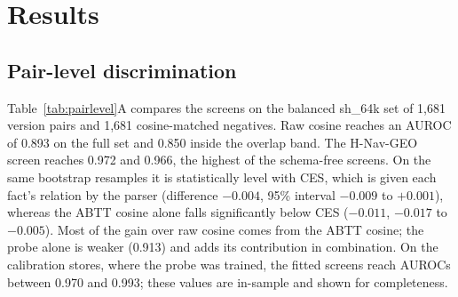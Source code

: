 \documentclass{CUP-JNL-NLP}
\newcommand{\sub}[1]{\textsf{sh\_#1}}                    %
\newcommand{\geo}{H-Nav-GEO}
\begin{document}
\section{Results}
\label{sec:results}

\subsection{Pair-level discrimination}
\label{sec:pairlevel}

Table~\ref{tab:pairlevel}A compares the screens on the balanced \sub{64k} set of 1,681 version pairs and 1,681 cosine-matched negatives. Raw cosine reaches an AUROC of 0.893 on the full set and 0.850 inside the overlap band. The \geo{} screen reaches 0.972 and 0.966, the highest of the schema-free screens. On the same bootstrap resamples it is statistically level with CES, which is given each fact's relation by the parser (difference $-0.004$, 95\% interval $-0.009$ to $+0.001$), whereas the ABTT cosine alone falls significantly below CES ($-0.011$, $-0.017$ to $-0.005$). Most of the gain over raw cosine comes from the ABTT cosine; the probe alone is weaker (0.913) and adds its contribution in combination. On the calibration stores, where the probe was trained, the fitted screens reach AUROCs between 0.970 and 0.993; these values are in-sample and shown for completeness.
\end{document}
